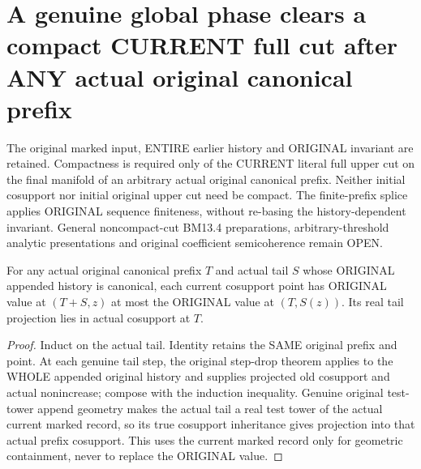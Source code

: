 \section{A genuine global phase clears a compact CURRENT full cut after ANY actual original canonical prefix}

The original marked input, ENTIRE earlier history and ORIGINAL invariant are
retained. Compactness is required only of the CURRENT literal full upper cut
on the final manifold of an arbitrary actual original canonical prefix.
Neither initial cosupport nor initial original upper cut need be compact.
The finite-prefix splice applies ORIGINAL sequence finiteness, without
re-basing the history-dependent invariant. General noncompact-cut BM13.4
preparations, arbitrary-threshold analytic presentations and original
coefficient semicoherence remain OPEN.

\begin{lemma}
\label{hir:original-tail-whole-value-prefix-nonincrease}
\leanok
For any actual original canonical prefix $T$ and actual tail $S$ whose
ORIGINAL appended history is canonical, each current cosupport point has
ORIGINAL value at $(T+S,z)$ at most the ORIGINAL value at $(T,S(z))$.
Its real tail projection lies in actual cosupport at $T$.
\end{lemma}
\begin{proof}
Induct on the actual tail. Identity retains the SAME original prefix and
point. At each genuine tail step, the original step-drop theorem applies
to the WHOLE appended original history and supplies projected old cosupport
and actual nonincrease; compose with the induction inequality. Genuine
original test-tower append geometry makes the actual tail a real test tower
of the actual current marked record, so its true cosupport inheritance gives
projection into that actual prefix cosupport. This uses the current marked
record only for geometric containment, never to replace the ORIGINAL value.
\end{proof}

